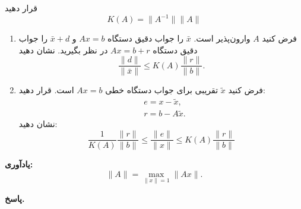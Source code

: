 قرار دهید
\[K(A) = \|A^{-1}\|\|A\|\]
\begin{enumerate}
	\item[الف)] فرض کنید 
	\(A\)
	وارون‌پذیر است. 
	\(\bar{x}\)
	را جواب دقیق دستگاه 
	\(Ax = b\)
	و
	\(\bar{x} +d\)
	را جواب دقیق دستگاه 
	\(Ax = b + r\)
	 در نظر بگیرید. نشان دهید
	\[\frac{\|d\|}{\|\bar{x}\|} \leq K(A) \frac{\|r\|}{\|b\|}.  \]
	\vspace*{.3cm}
	\item[ب)] 
	فرض کنید 
	\(\tilde{x}\)
	تقریبی برای جواب دستگاه خطی
	\(Ax = b\)
	است. قرار دهید:
	\begin{align*}
		& e = x - \tilde{x},\\
		& r= b -A\tilde{x}.
	\end{align*}
	نشان دهید:
	\[
	\frac{1}{K(A)} \frac{\|r\|}{\|b\|} \leq \frac{\|e\|}{\|x\|} \leq  K(A) \frac{\|r\|}{\|b\|}
	\]
		\vspace*{.3cm}
	
\end{enumerate}
\textbf{یادآوری:}
\[\|A\| = \max_{\|x\|=1} \|Ax\|.\]

\begin{answer}
	
	\textbf{پاسخ.}
	
\end{answer}